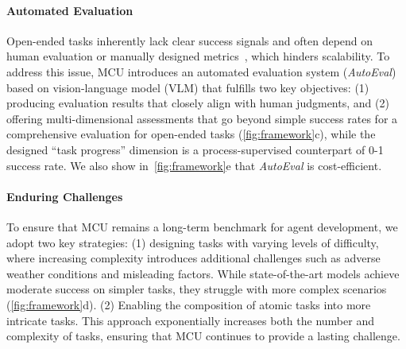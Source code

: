 

\paragraph{Automated Evaluation} Open-ended tasks \citep{open-end, open-end2} inherently lack clear success signals and often depend on human evaluation or manually designed metrics~\citep{human-eval}, which hinders scalability. To address this issue, MCU introduces an automated evaluation system (\emph{AutoEval}) based on vision-language model (VLM) that fulfills two key objectives: (1) producing evaluation results that closely align with human judgments, and (2) offering multi-dimensional assessments that go beyond simple success rates for a comprehensive evaluation for open-ended tasks (\cref{fig:framework}c), while the designed ``task progress'' dimension is a process-supervised counterpart of 0-1 success rate. We also show in~\cref{fig:framework}e that \emph{AutoEval} is cost-efficient.


\paragraph{Enduring Challenges}
To ensure that MCU remains a long-term benchmark for agent development, we adopt two key strategies: (1) designing tasks with varying levels of difficulty, where increasing complexity introduces additional challenges such as adverse weather conditions and misleading factors. While state-of-the-art models achieve moderate success on simpler tasks, they struggle with more complex scenarios (\cref{fig:framework}d). (2) Enabling the composition of atomic tasks into more intricate tasks. This approach exponentially increases both the number and complexity of tasks, ensuring that MCU continues to provide a lasting challenge.







